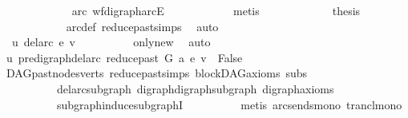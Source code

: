 \begin{isabellebody}
\ \ \ \ \ \ \ \ \ \ \isamarkupfalse%
\ \ arc\ wf{\isacharunderscore}{\kern0pt}digraph{\isachardot}{\kern0pt}arcE\isanewline
\ \ \ \ \ \ \ \ \ \ \isamarkupfalse%
\ metis\ \isanewline
\ \ \ \ \ \ \ \ \isamarkupfalse%
\ \isamarkupfalse%
\ {\isacharquery}{\kern0pt}thesis\isanewline
\ \ \ \ \ \ \ \ \ \ \isamarkupfalse%
\ arc{\isacharunderscore}{\kern0pt}def\ reduce{\isacharunderscore}{\kern0pt}past{\isachardot}{\kern0pt}simps\ \isamarkupfalse%
\ auto\isanewline
\ \ \ \ \ \ \isamarkupfalse%
\ \ \ \ \isanewline
\ \ \ \ \ \ \isamarkupfalse%
\ \isamarkupfalse%
\ {\isachardoublequoteopen}{\isasymnot}\ u\ {\isasymrightarrow}\isactrlsup {\isacharplus}{\kern0pt}\isactrlbsub del{\isacharunderscore}{\kern0pt}arc\ e\isactrlesub \ v{\isachardoublequoteclose}\isanewline
\ \ \ \ \ \ \ \ \isamarkupfalse%
\ only{\isacharunderscore}{\kern0pt}new\ \isamarkupfalse%
\ auto\ \ \ \ \ \ \ \ \isanewline
\ \ \ \ \ \ \isamarkupfalse%
\ \isamarkupfalse%
\ {\isachardoublequoteopen}u\ {\isasymrightarrow}\isactrlsup {\isacharplus}{\kern0pt}\isactrlbsub pre{\isacharunderscore}{\kern0pt}digraph{\isachardot}{\kern0pt}del{\isacharunderscore}{\kern0pt}arc\ {\isacharparenleft}{\kern0pt}reduce{\isacharunderscore}{\kern0pt}past\ G\ a{\isacharparenright}{\kern0pt}\ e\isactrlesub \ v\ {\isasymLongrightarrow}\ False{\isachardoublequoteclose}\isanewline
\ \ \ \ \ \ \ \ \isamarkupfalse%
\ DAG{\isachardot}{\kern0pt}past{\isacharunderscore}{\kern0pt}nodes{\isacharunderscore}{\kern0pt}verts\ reduce{\isacharunderscore}{\kern0pt}past{\isachardot}{\kern0pt}simps\ blockDAG{\isacharunderscore}{\kern0pt}axioms\ subs{\isacharparenleft}{\kern0pt}{}{\isacharparenright}{\kern0pt}\isanewline
\ \ \ \ \ \ \ \ \ \ del{\isacharunderscore}{\kern0pt}arc{\isacharunderscore}{\kern0pt}subgraph\ digraph{\isachardot}{\kern0pt}digraph{\isacharunderscore}{\kern0pt}subgraph\ digraph{\isacharunderscore}{\kern0pt}axioms\ \isanewline
\ \ \ \ \ \ \ \ \ \ subgraph{\isacharunderscore}{\kern0pt}induce{\isacharunderscore}{\kern0pt}subgraphI\isanewline
\ \ \ \ \ \ \ \ \isamarkupfalse%
\ {\isacharparenleft}{\kern0pt}metis\ arcs{\isacharunderscore}{\kern0pt}ends{\isacharunderscore}{\kern0pt}mono\ trancl{\isacharunderscore}{\kern0pt}mono{\isacharparenright}{\kern0pt}\isanewline
\ \ \ \ \isamarkupfalse%
\isanewline
\ \ \isamarkupfalse%
\ \ \isanewline

\end{isabellebody}
